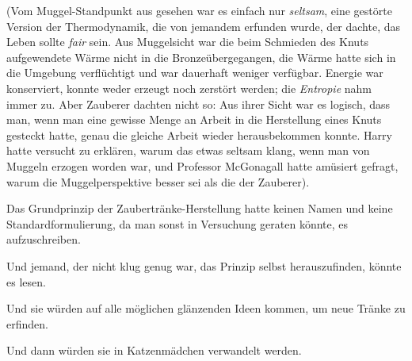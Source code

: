 (Vom Muggel-Standpunkt aus gesehen war es einfach nur \emph{seltsam}, eine gestörte Version der Thermodynamik, die von jemandem erfunden wurde, der dachte, das Leben sollte \emph{fair} sein. Aus Muggelsicht war die beim Schmieden des Knuts aufgewendete Wärme nicht in die Bronzeübergegangen, die Wärme hatte sich in die Umgebung verflüchtigt und war dauerhaft weniger verfügbar. Energie war konserviert, konnte weder erzeugt noch zerstört werden; die \emph{Entropie} nahm immer zu. Aber Zauberer dachten nicht so: Aus ihrer Sicht war es logisch, dass man, wenn man eine gewisse Menge an Arbeit in die Herstellung eines Knuts gesteckt hatte, genau die gleiche Arbeit wieder herausbekommen konnte. Harry hatte versucht zu erklären, warum das etwas seltsam klang, wenn man von Muggeln erzogen worden war, und Professor McGonagall hatte amüsiert gefragt, warum die Muggelperspektive besser sei als die der Zauberer).

Das Grundprinzip der Zaubertränke-Herstellung hatte keinen Namen und keine Standardformulierung, da man sonst in Versuchung geraten könnte, es aufzuschreiben.

Und jemand, der nicht klug genug war, das Prinzip selbst herauszufinden, könnte es lesen.

Und sie würden auf alle möglichen glänzenden Ideen kommen, um neue Tränke zu erfinden.

Und dann würden sie in Katzenmädchen verwandelt werden.

